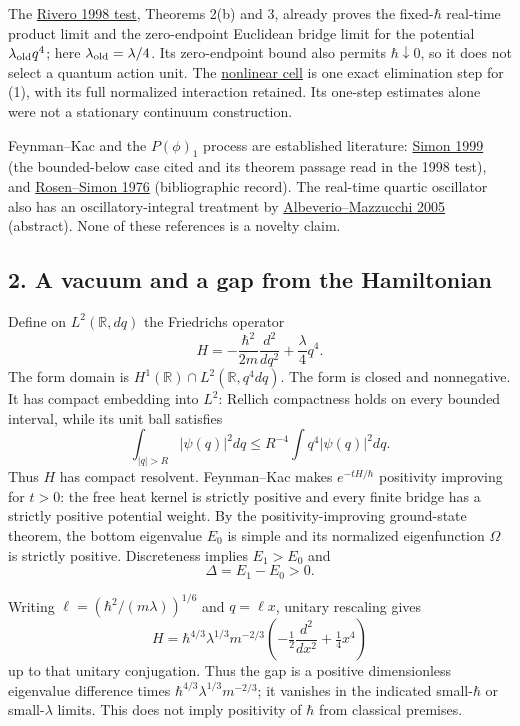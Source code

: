 \documentclass[11pt,a4paper]{article}
\begin{document}
The \href{rivero-1998-conjecture-central-forces.md}{Rivero 1998 test},
Theorems 2(b) and 3, already proves the fixed-\(\hbar\) real-time
product limit and the zero-endpoint Euclidean bridge limit for the
potential \(\lambda_{\rm old}q^4\); here
\(\lambda_{\rm old}=\lambda/4\). Its zero-endpoint bound also permits
\(\hbar\downarrow0\), so it does not select a quantum action unit. The
\href{newton-nonlinear-time-cell.md}{nonlinear cell} is one exact
elimination step for (1), with its full normalized interaction retained.
Its one-step estimates alone were not a stationary continuum
construction.

Feynman--Kac and the \(P(\phi)_1\) process are established literature:
\href{https://arxiv.org/abs/math-ph/9907022}{Simon 1999} (the
bounded-below case cited and its theorem passage read in the 1998 test),
and \href{https://math.caltech.edu/simon/biblio.html}{Rosen--Simon 1976}
(bibliographic record). The real-time quartic oscillator also has an
oscillatory-integral treatment by
\href{https://archive.numdam.org/articles/10.1016/j.crma.2005.09.024/}{Albeverio--Mazzucchi
2005} (abstract). None of these references is a novelty claim.

\hypertarget{a-vacuum-and-a-gap-from-the-hamiltonian}{%
\subsection{2. A vacuum and a gap from the
Hamiltonian}\label{a-vacuum-and-a-gap-from-the-hamiltonian}}

Define on \(L^2(\mathbb R,dq)\) the Friedrichs operator
\[ H=-\frac{\hbar^2}{2m}\frac{d^2}{dq^2}+\frac{\lambda}{4}q^4.\tag{2}\]
The form domain is \(H^1(\mathbb R)\cap L^2(\mathbb R,q^4dq)\). The form
is closed and nonnegative. It has compact embedding into \(L^2\):
Rellich compactness holds on every bounded interval, while its unit ball
satisfies
\[\int_{|q|>R}|\psi(q)|^2dq\le R^{-4}\int q^4|\psi(q)|^2dq.\tag{3}\]
Thus \(H\) has compact resolvent. Feynman--Kac makes \(e^{-tH/\hbar}\)
positivity improving for \(t>0\): the free heat kernel is strictly
positive and every finite bridge has a strictly positive potential
weight. By the positivity-improving ground-state theorem, the bottom
eigenvalue \(E_0\) is simple and its normalized eigenfunction \(\Omega\)
is strictly positive. Discreteness implies \(E_1>E_0\) and
\[\Delta=E_1-E_0>0.\tag{4}\]

Writing \(\ell=(\hbar^2/(m\lambda))^{1/6}\) and \(q=\ell x\), unitary
rescaling gives \[H=\hbar^{4/3}\lambda^{1/3}m^{-2/3}
\left(-\tfrac12\frac{d^2}{dx^2}+\tfrac14x^4\right)\tag{5}\] up to that
unitary conjugation. Thus the gap is a positive dimensionless eigenvalue
difference times \(\hbar^{4/3}\lambda^{1/3}m^{-2/3}\); it vanishes in
the indicated small-\(\hbar\) or small-\(\lambda\) limits. This does not
imply positivity of \(\hbar\) from classical premises.
\end{document}
